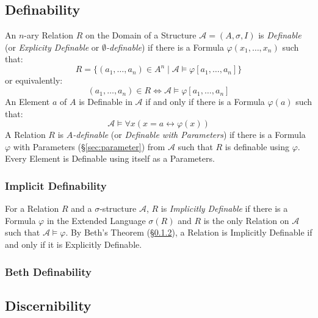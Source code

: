 \subsection{Definability}\label{sec:definability}

An $n$-ary Relation $R$ on the Domain of a Structure $\mathcal{A} =
(A, \sigma, I)$ is \emph{Definable} (or \emph{Explicity Definable} or
\emph{$\emptyset$-definable}) if there is a Formula $\varphi
(x_1,\ldots,x_n)$ such that:
\[
  R = \{(a_1,\ldots,a_n) \in A^n \;|\; \mathcal{A} \models \varphi
    [a_1, \ldots, a_n]\}
\]
or equivalently:
\[
  (a_1, \ldots, a_n) \in R \Leftrightarrow \mathcal{A} \models
    \varphi[a_1, \ldots, a_n]
\]
An Element $a$ of $A$ is Definable in $\mathcal{A}$ if and only if
there is a Formula $\varphi(a)$ such that:
\[
  \mathcal{A} \models \forall x (x = a \leftrightarrow \varphi(x))
\]
A Relation $R$ is \emph{$A$-definable} (or \emph{Definable with
  Parameters}) if there is a Formula $\varphi$ with Parameters
(\S\ref{sec:parameter}) from $\mathcal{A}$ such that $R$ is definable
using $\varphi$. Every Element is Definable using itself as a
Parameters.



\subsubsection{Implicit Definability}\label{sec:implicit_definability}

For a Relation $R$ and a $\sigma$-structure $\mathcal{A}$, $R$ is
\emph{Implicitly Definable} if there is a Formula $\varphi$ in the
Extended Language $\sigma(R)$ and $R$ is the only Relation on
$\mathcal{A}$ such that $\mathcal{A} \models \varphi$. By Beth's
Theorem (\S\ref{sec:beth_definability}), a Relation is Implicitly
Definable if and only if it is Explicitly Definable.



\subsubsection{Beth Definability}\label{sec:beth_definability}



\subsection{Discernibility}\label{sec:discernibility}
\cite{ladyman-linnebo-pettigrew11}

